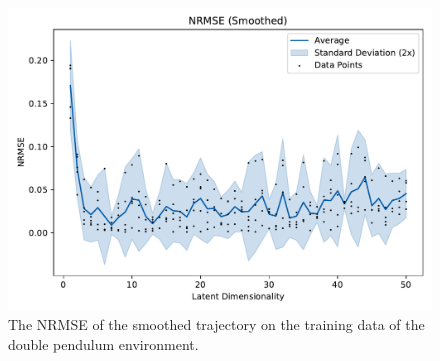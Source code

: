 			\begin{figure}
				\centering
				\includegraphics[width=0.7\linewidth]{figures/results/acrobot-gym/latent-dim/comparison-rmse-smoothed-normalized-mean-vs-latent-dim.pdf}
				\caption[Error of the smoothed trajectory on the training data of the double pendulum experiment]{The NRMSE of the smoothed trajectory on the training data of the double pendulum environment.}
				\label{fig:acrobotRmseSmoothed}
			\end{figure}

